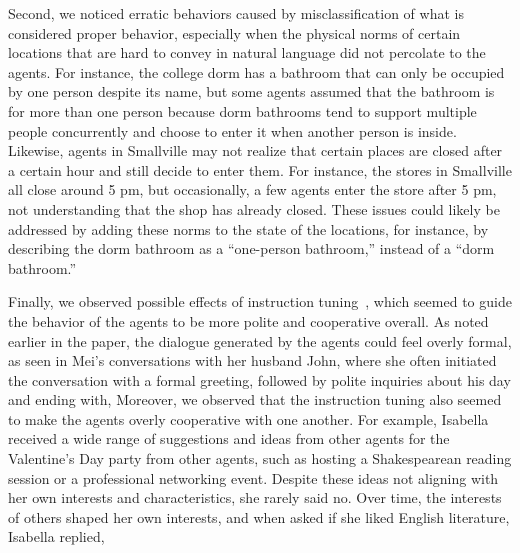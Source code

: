 Second, we noticed erratic behaviors caused by misclassification of what is considered proper behavior, especially when the physical norms of certain locations that are hard to convey in natural language did not percolate to the agents. For instance, the college dorm has a bathroom that can only be occupied by one person despite its name, but some agents assumed that the bathroom is for more than one person because dorm bathrooms tend to support multiple people concurrently and choose to enter it when another person is inside. Likewise, agents in Smallville may not realize that certain places are closed after a certain hour and still decide to enter them. For instance, the stores in Smallville all close around 5 pm, but occasionally, a few agents enter the store after 5 pm, not understanding that the shop has already closed. These issues could likely be addressed by adding these norms to the state of the locations, for instance, by describing the dorm bathroom as a ``one-person bathroom,'' instead of a ``dorm bathroom.''

Finally, we observed possible effects of instruction tuning~\cite{ouyang2022training}, which seemed to guide the behavior of the agents to be more polite and cooperative overall. As noted earlier in the paper, the dialogue generated by the agents could feel overly formal, as seen in Mei's conversations with her husband John, where she often initiated the conversation with a formal greeting, followed by polite inquiries about his day and ending with,  Moreover, we observed that the instruction tuning also seemed to make the agents overly cooperative with one another. For example, Isabella received a wide range of suggestions and ideas from other agents for the Valentine's Day party from other agents, such as hosting a Shakespearean reading session or a professional networking event. Despite these ideas not aligning with her own interests and characteristics, she rarely said no. Over time, the interests of others shaped her own interests, and when asked if she liked English literature, Isabella replied,  
